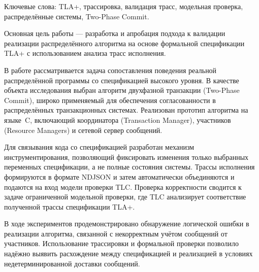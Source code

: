 \abstract %

Ключевые слова: TLA+, трассировка, валидация трасс, модельная проверка,
распределённые системы, Two-Phase Commit.

Основная цель работы — разработка и апробация подхода к валидации
реализации распределённого алгоритма на основе формальной спецификации
TLA+ с использованием анализа трасс исполнения.

В работе рассматривается задача сопоставления поведения реальной
распределённой программы со спецификацией высокого уровня. В качестве
объекта исследования выбран алгоритм двухфазной транзакции (Two-Phase Commit),
широко применяемый для обеспечения согласованности в распределённых
транзакционных системах. Реализован прототип алгоритма на языке~C,
включающий координатора (Transaction Manager), участников (Resource
Managers) и сетевой сервер сообщений.

Для связывания кода со спецификацией разработан механизм инструментирования,
позволяющий фиксировать изменения только выбранных переменных спецификации,
а не полные состояния системы. Трассы исполнения формируются в формате
NDJSON и затем автоматически объединяются и подаются на вход модели
проверки TLC. Проверка корректности сводится к задаче ограниченной
модельной проверки, где TLC анализирует соответствие полученной трассы
спецификации TLA+.

В ходе экспериментов продемонстрировано обнаружение логической ошибки в
реализации алгоритма, связанной с некорректным учётом сообщений от участников.
Использование трассировки и формальной проверки позволило надёжно выявить
расхождение между спецификацией и реализацией в условиях недетерминированной
доставки сообщений.
